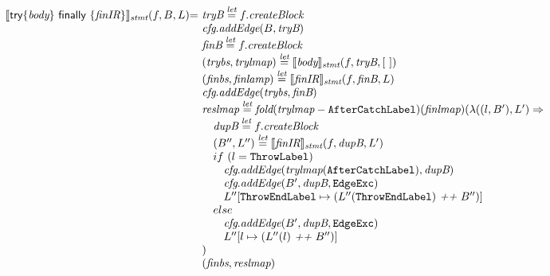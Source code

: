 \[\begin{array}{l@{}l@{~}l}
\transfun{\ircfgtryfin{\emph{body}}{\emph{finIR}}}_{\emph{stmt}}(f, B, L)
& = & \emph{tryB} \letval f.\emph{createBlock}\\
& & \emph{cfg}.\emph{addEdge}(B, \emph{tryB})\\
& & \emph{finB} \letval f.\emph{createBlock}\\
& & (\emph{trybs}, \emph{trylmap}) \letval \transfun{\emph{body}}_{\emph{stmt}}(f, \emph{tryB}, [\ ])\\
& & (\emph{finbs}, \emph{finlamp}) \letval \transfun{\emph{finIR}}_{\emph{stmt}}(f, \emph{finB}, L)\\
& & \emph{cfg}.\emph{addEdge}(\emph{trybs}, \emph{finB})\\
& & \emph{reslmap} \letval \fold(\emph{trylmap} - \AfterCatchLabel)(\emph{finlmap})
(\lambda((l, B'), L') \Rightarrow \\
& & \quad \emph{dupB} \letval f.\emph{createBlock}\\
& & \quad (B'', L'') \letval \transfun{\emph{finIR}}_{\emph{stmt}}(f, \emph{dupB}, L')\\
& & \quad if\ (l = \ThrowLabel)\\
& & \quad \phantom{if} \emph{cfg}.\emph{addEdge}(\emph{trylmap}(\AfterCatchLabel), \emph{dupB})\\
& & \quad \phantom{if} \emph{cfg}.\emph{addEdge}(B', \emph{dupB}, \EdgeExc)\\
& & \quad \phantom{if} L''[\ThrowEndLabel \mapsto (L''(\ThrowEndLabel) ~\emph{++}~ B'')]\\
& & \quad else\\
& & \quad \phantom{if} \emph{cfg}.\emph{addEdge}(B', \emph{dupB}, \EdgeExc)\\
& & \quad \phantom{if} L''[l \mapsto (L''(l) ~\emph{++}~ B'')]\\
& & )\\
& & (\emph{finbs}, \emph{reslmap})\\
& & \\
\end{array}
\]

